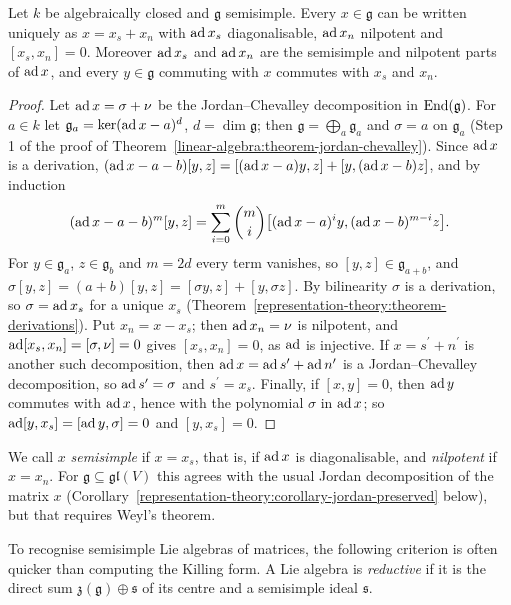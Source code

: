 \begin{proposition}\label{representation-theory:proposition-abstract-jordan}
Let $k$ be algebraically closed and $\mathfrak{g}$ semisimple. Every $x \in \mathfrak{g}$ can be written uniquely as $x = x_s + x_n$ with $\operatorname{ad} x_s$ diagonalisable, $\operatorname{ad} x_n$
nilpotent and $[x_s, x_n] = 0$. Moreover $\operatorname{ad} x_s$ and $\operatorname{ad} x_n$ are the semisimple and nilpotent parts of $\operatorname{ad} x$, and every $y \in \mathfrak{g}$ commuting with $x$ commutes with
$x_s$ and $x_n$.
\end{proposition}

\begin{proof}
Let $\operatorname{ad} x = \sigma + \nu$ be the Jordan--Chevalley decomposition in $\operatorname{End}(\mathfrak{g})$. For $a \in k$ let $\mathfrak{g}_a = \ker(\operatorname{ad} x - a)^d$, $d = \dim\mathfrak{g}$; then
$\mathfrak{g} = \bigoplus_a\mathfrak{g}_a$ and $\sigma = a$ on $\mathfrak{g}_a$ (Step 1 of the proof of Theorem~\ref{linear-algebra:theorem-jordan-chevalley}). Since $\operatorname{ad} x$ is a
derivation, $(\operatorname{ad} x - a - b)[y, z] = [(\operatorname{ad} x - a)y, z] + [y, (\operatorname{ad} x - b)z]$, and by induction
\[
(\operatorname{ad} x - a - b)^m[y, z] = \sum_{i=0}^m\binom{m}{i}\bigl[(\operatorname{ad} x - a)^iy, (\operatorname{ad} x - b)^{m-i}z\bigr].
\]
For $y \in \mathfrak{g}_a$, $z \in \mathfrak{g}_b$ and $m = 2d$ every term vanishes, so $[y, z] \in \mathfrak{g}_{a+b}$, and
$\sigma[y, z] = (a + b)[y, z] = [\sigma y, z] + [y, \sigma z]$. By bilinearity $\sigma$ is a derivation, so $\sigma = \operatorname{ad} x_s$ for a unique $x_s$
(Theorem~\ref{representation-theory:theorem-derivations}). Put $x_n = x - x_s$; then $\operatorname{ad} x_n = \nu$ is nilpotent, and $\operatorname{ad}[x_s, x_n] = [\sigma, \nu] = 0$ gives
$[x_s, x_n] = 0$, as $\operatorname{ad}$ is injective. If $x = s^{\prime} + n^{\prime}$ is another such decomposition, then $\operatorname{ad} x = \operatorname{ad} s^{\prime} + \operatorname{ad} n^{\prime}$ is a Jordan--Chevalley
decomposition, so $\operatorname{ad} s^{\prime} = \sigma$ and $s^{\prime} = x_s$. Finally, if $[x, y] = 0$, then $\operatorname{ad} y$ commutes with $\operatorname{ad} x$, hence with the polynomial $\sigma$ in $\operatorname{ad} x$;
so $\operatorname{ad}[y, x_s] = [\operatorname{ad} y, \sigma] = 0$ and $[y, x_s] = 0$.
\end{proof}

We call $x$ \emph{semisimple} if $x = x_s$, that is, if $\operatorname{ad} x$ is diagonalisable, and \emph{nilpotent} if $x = x_n$. For $\mathfrak{g} \subseteq \mathfrak{gl}(V)$ this agrees
with the usual Jordan decomposition of the matrix $x$ (Corollary~\ref{representation-theory:corollary-jordan-preserved} below), but that requires Weyl's theorem.

To recognise semisimple Lie algebras of matrices, the following criterion is often quicker than computing the Killing form. A Lie algebra is \emph{reductive} if it is the direct sum
$\mathfrak{z}(\mathfrak{g}) \oplus \mathfrak{s}$ of its centre and a semisimple ideal $\mathfrak{s}$.

